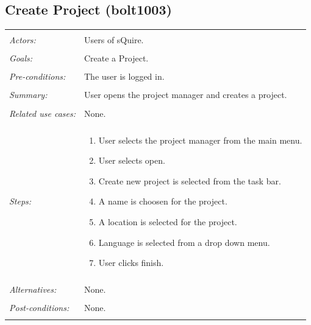 \documentclass[11pt]{report}
\begin{document}
\begin{IDE-like Features}
\begin{}
\begin{Collaborative features that would be "nice":}
\subsection{Create Project (bolt1003)}
\begin{tabular}{ p{2cm} p{12cm} }
 \hline
 \\
 \textit{Actors:} & Users of sQuire. \\ 
 \\
 \textit{Goals:} & Create a Project. \\
 \\
 \textit{Pre-conditions:} & The user is logged in. \\
 \\
 \textit{Summary:} & User opens the project manager and creates a project. \\ 
 \\
 \textit{Related use cases:} & None. \\ 
 \\
 \textit{Steps:} & \begin{enumerate}
  \item User selects the project manager from the main menu.
  \item User selects open.
  \item Create new project is selected from the task bar.
  \item A name is choosen for the project.
  \item A location is selected for the project.
  \item Language is selected from a drop down menu.
  \item User clicks finish.
 \end{enumerate} \\
 \\
 \textit{Alternatives:} & None. \\
 \\
 \textit{Post-conditions:} & None. \\
 \\
\hline
\end{tabular}


\end{Collaborative features that would be "nice":}
\end{}
\end{IDE-like Features}
\end{document}

